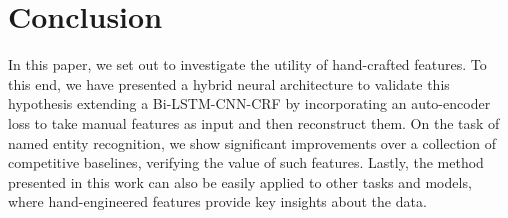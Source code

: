 \section{Conclusion}
In this paper, we set out to investigate the utility of hand-crafted features. 
To this end, we have presented a hybrid neural architecture to validate this hypothesis extending a Bi-LSTM-CNN-CRF by incorporating an auto-encoder loss to take manual features as input and then reconstruct them. 
On the task of named entity recognition, we show significant improvements over a collection of competitive baselines, verifying the value of such features.
Lastly, the method presented in this work can also be easily applied to other tasks and models, where hand-engineered features provide key insights about the data.
